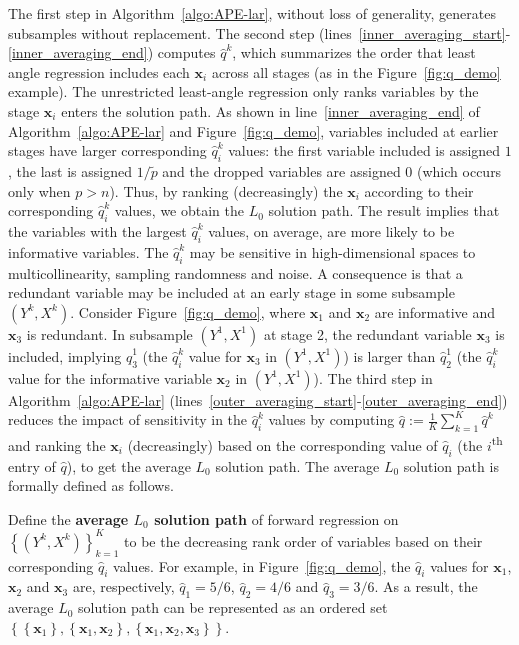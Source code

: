 \documentclass[12pt]{article}
\begin{document}
The first step in Algorithm~\ref{algo:APE-lar}, without loss of generality, generates subsamples without replacement. The second step (lines~\ref{inner_averaging_start}-\ref{inner_averaging_end}) computes $\widehat{q}^k$, which summarizes the order that least angle regression includes each $\mathbf{x}_i$ across all stages (as in the Figure~\ref{fig:q_demo} example). The unrestricted least-angle regression only ranks variables by the stage $\mathbf{x}_i$ enters the solution path. As shown in line~\ref{inner_averaging_end} of Algorithm~\ref{algo:APE-lar} and Figure~\ref{fig:q_demo}, variables included at earlier stages have larger corresponding $\widehat{q}^k_i$ values: the first variable included is assigned $1$, the last is assigned $1/\widetilde{p}$ and the dropped variables are assigned $0$ (which occurs only when $p > n$). Thus, by ranking (decreasingly) the $\mathbf{x}_i$ according to their corresponding $\widehat{q}^k_i$ values, we obtain the $L_0$ solution path. The \citet[Theorem 2]{zhang09} result implies that the variables with the largest $\widehat{q}^k_i$ values, on average, are more likely to be informative variables. The $\widehat{q}^k_i$ may be sensitive in high-dimensional spaces to multicollinearity, sampling randomness and noise. A consequence is that a redundant variable may be included at an early stage in some subsample $\left( Y^k, X^k \right)$. Consider Figure~\ref{fig:q_demo}, where $\mathbf{x}_1$ and $\mathbf{x}_2$ are informative and $\mathbf{x}_3$ is redundant. In subsample $\left( Y^1, X^1 \right)$ at stage 2, the redundant variable $\mathbf{x}_3$ is included, implying $\widehat{q}^1_3$ (the $\widehat{q}^k_i$ value for $\mathbf{x}_3$ in $\left( Y^1, X^1 \right)$) is larger than $\widehat{q}^1_2$ (the $\widehat{q}^k_i$ value for the informative variable $\mathbf{x}_2$ in $\left( Y^1, X^1 \right)$). The third step in Algorithm~\ref{algo:APE-lar} (lines~\ref{outer_averaging_start}-\ref{outer_averaging_end}) reduces the impact of sensitivity in the $\widehat{q}^k_i$ values by computing $\widehat{q} := \frac{1}{K} \sum_{k=1}^{K} \widehat{q}^k$ and ranking the $\mathbf{x}_i$ (decreasingly) based on the corresponding value of $\widehat{q}_i$ (the $i$\textsuperscript{th} entry of $\widehat{q}$), to get the average $L_0$ solution path. The average $L_0$ solution path is formally defined as follows.
%
\begin{definition}
  Define the \textbf{average $L_0$ solution path} of forward regression on $\left\{ \left( Y^k, X^k \right) \right\}_{k=1}^{K}$ to be the decreasing rank order of variables based on their corresponding $\widehat{q}_i$ values. For example, in Figure~\ref{fig:q_demo}, the $\widehat{q}_i$ values for $\mathbf{x}_1$, $\mathbf{x}_2$ and $\mathbf{x}_3$ are, respectively, $\widehat{q}_1 = 5/6$, $\widehat{q}_2 = 4/6$ and $\widehat{q}_3 = 3/6$. As a result, the average $L_0$ solution path can be represented as an ordered set $\left\{ \left\{ \mathbf{x}_1 \right\}, \left\{ \mathbf{x}_1, \mathbf{x}_2 \right\}, \left\{ \mathbf{x}_1, \mathbf{x}_2, \mathbf{x}_3 \right\} \right\}$.
  \label{def:L_0_solution_path}
\end{definition}
\end{document}
